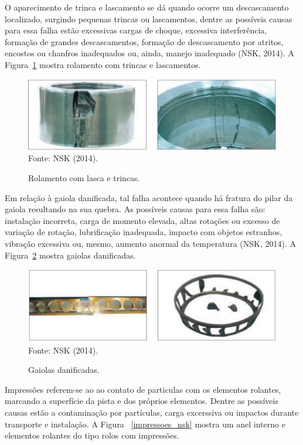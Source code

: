 \documentclass[
	12pt,				
	oneside,			
	a4paper,			
	english,			
	brazil,	
	sumario=abnt-6027-2012		
	]{abntex2ppgsi}
\begin{document}
O aparecimento de trinca e lascamento se dá quando ocorre um descascamento localizado, surgindo pequenas trincas ou lascamentos, dentre as possíveis causas para essa falha estão excessivas cargas de choque, excessiva interferência, formação de grandes descascamentos, formação de descascamento por atritos, encostos ou chanfros inadequados ou, ainda, manejo inadequado (NSK, 2014). A Figura~\ref{trinca_nsk} mostra rolamento com trincas e lascamentos. 

\begin{figure}[H]
\centering
\caption {Rolamento com lasca e trincas.}
\includegraphics[width=\textwidth,height=\textheight,keepaspectratio]{trinca_nsk} \\
Fonte: NSK (2014).
\label{trinca_nsk}
\end{figure}

Em relação à gaiola danificada, tal falha acontece quando há fratura do pilar da gaiola resultando na sua quebra. As possíveis causas para essa falha são: instalação incorreta, carga de momento elevada, altas rotações ou excesso de variação de rotação, lubrificação inadequada, impacto com objetos estranhos, vibração excessiva ou, mesmo, aumento anormal da temperatura (NSK, 2014). A Figura~\ref{gaiola_nsk} mostra gaiolas danificadas. 

\begin{figure}[H]
\centering
\caption {Gaiolas danificadas.}
\includegraphics[width=\textwidth,height=\textheight,keepaspectratio]{gaiola_nsk} \\
Fonte: NSK (2014).
\label{gaiola_nsk}
\end{figure}

Impressões referem-se ao ao contato de particulas com os elementos rolantes, marcando a superfície da pista e dos próprios elementos. Dentre as possíveis causas estão a contaminação por partículas, carga excerssiva ou impactos durante transporte e instalação. A Figura ~\ref{impressoes_nsk} mostra um anel interno e elementos rolantes do tipo rolos com impressões. 
\end{document}
